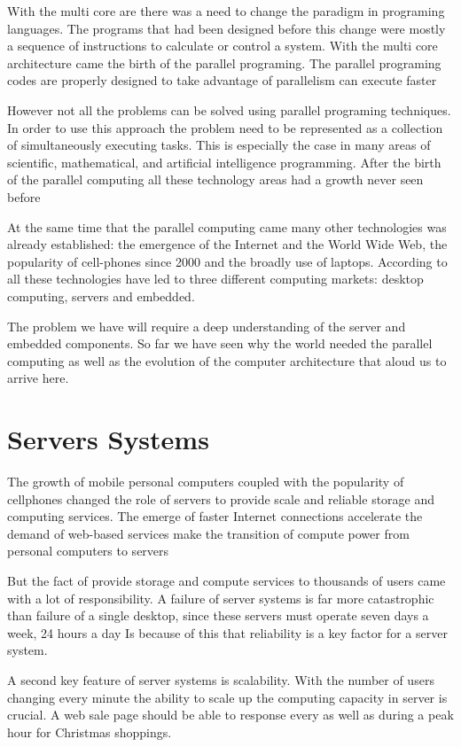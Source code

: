 With the multi core are there was a need to change the paradigm in programing
languages. The programs that had been designed before this change were mostly a
sequence of instructions to calculate or control a system. With the multi core
architecture came the birth of the parallel programing. The parallel programing
codes are properly designed to take advantage of parallelism can execute faster 

However not all the problems can be solved using parallel programing
techniques. In order to use this approach the problem need to be represented as
a collection of simultaneously executing tasks. This is especially the case in
many areas of scientific, mathematical, and artificial intelligence
programming. After the birth of the parallel computing all these technology
areas had a growth never seen before

At the same time that the parallel computing came many other technologies was
already established: the emergence of the Internet and the World Wide Web, the
popularity of cell-phones since 2000 and the broadly use of laptops. According
to \cite{Henessy} all  these technologies have led to three different computing
markets: desktop computing, servers and embedded. 

The problem we have will require a deep understanding of the server and
embedded components. So far we have seen why the world needed the parallel
computing as well as the evolution of the computer architecture that aloud us
to arrive here.

\section{Servers Systems}
\noindent

The growth of mobile personal computers coupled with the popularity of
cellphones changed the role of servers to provide scale and reliable storage
and computing services. The emerge of faster Internet connections accelerate
the demand of web-based services make the transition of compute power from
personal computers to servers

But the fact of provide storage and compute services to thousands of users came
with a lot of responsibility. A failure of server systems is far more
catastrophic than failure of a single desktop, since these servers must operate
seven days a week, 24 hours a day Is because of this that reliability is a key
factor for a server system.

A second key feature of server systems is scalability. With the number of users
changing every minute the ability to scale up the computing capacity
in server is crucial. A web sale page should be able to response every as well
as during a peak hour for Christmas shoppings.

